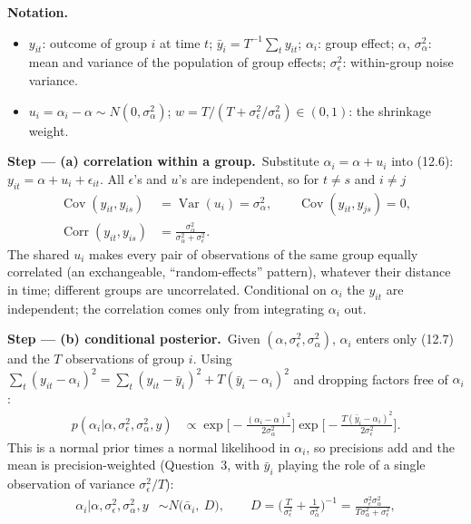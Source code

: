 \documentclass[11pt,a4paper]{article}
\newenvironment{notacao}{\par\smallskip\noindent\textbf{Notation.}\begin{itemize}[leftmargin=1.4em,topsep=1pt,itemsep=0pt]\small}{\end{itemize}}
\newcommand{\passo}[2]{\par\smallskip\noindent\textbf{Step --- #1.}~#2}
\begin{document}
\begin{sol}
\begin{notacao}
\item $y_{it}$: outcome of group $i$ at time $t$; $\bar y_i=T^{-1}\sum_ty_{it}$; $\alpha_i$: group effect; $\alpha$, $\sigma_\alpha^2$: mean and variance of the population of group effects; $\sigma_\epsilon^2$: within-group noise variance.
\item $u_i=\alpha_i-\alpha\sim N(0,\sigma_\alpha^2)$; $w=T/(T+\sigma_\epsilon^2/\sigma_\alpha^2)\in(0,1)$: the shrinkage weight.
\end{notacao}
\passo{(a) correlation within a group}{Substitute $\alpha_i=\alpha+u_i$ into (12.6): $y_{it}=\alpha+u_i+\epsilon_{it}$. All $\epsilon$'s and $u$'s are independent, so for $t\ne s$ and $i\ne j$
\begin{align}
\operatorname{Cov}(y_{it},y_{is})&=\operatorname{Var}(u_i)=\sigma_\alpha^2,\qquad\operatorname{Cov}(y_{it},y_{js})=0,\label{k122:cov}\\
\operatorname{Corr}(y_{it},y_{is})&=\frac{\sigma_\alpha^2}{\sigma_\alpha^2+\sigma_\epsilon^2}.\label{k122:icc}
\end{align}
The shared $u_i$ makes every pair of observations of the same group equally correlated (an exchangeable, ``random-effects'' pattern), whatever their distance in time; different groups are uncorrelated. Conditional on $\alpha_i$ the $y_{it}$ are independent; the correlation comes only from integrating $\alpha_i$ out.}
\passo{(b) conditional posterior}{Given $(\alpha,\sigma_\epsilon^2,\sigma_\alpha^2)$, $\alpha_i$ enters only (12.7) and the $T$ observations of group $i$. Using $\sum_t(y_{it}-\alpha_i)^2=\sum_t(y_{it}-\bar y_i)^2+T(\bar y_i-\alpha_i)^2$ and dropping factors free of $\alpha_i$:
\begin{align}
p(\alpha_i|\alpha,\sigma_\epsilon^2,\sigma_\alpha^2,y)&\propto\exp\Big[-\frac{(\alpha_i-\alpha)^2}{2\sigma_\alpha^2}\Big]\exp\Big[-\frac{T(\bar y_i-\alpha_i)^2}{2\sigma_\epsilon^2}\Big].\label{k122:kern}
\end{align}
This is a normal prior times a normal likelihood in $\alpha_i$, so precisions add and the mean is precision-weighted (Question~3, with $\bar y_i$ playing the role of a single observation of variance $\sigma_\epsilon^2/T$):
\begin{align}
\alpha_i|\alpha,\sigma_\epsilon^2,\sigma_\alpha^2,y&\sim N\big(\bar\alpha_i,\ D\big),\qquad D=\Big(\frac{T}{\sigma_\epsilon^2}+\frac1{\sigma_\alpha^2}\Big)^{-1}=\frac{\sigma_\epsilon^2\sigma_\alpha^2}{T\sigma_\alpha^2+\sigma_\epsilon^2},\label{k122:post}\\

\end{align}}
\end{sol}
\end{document}
